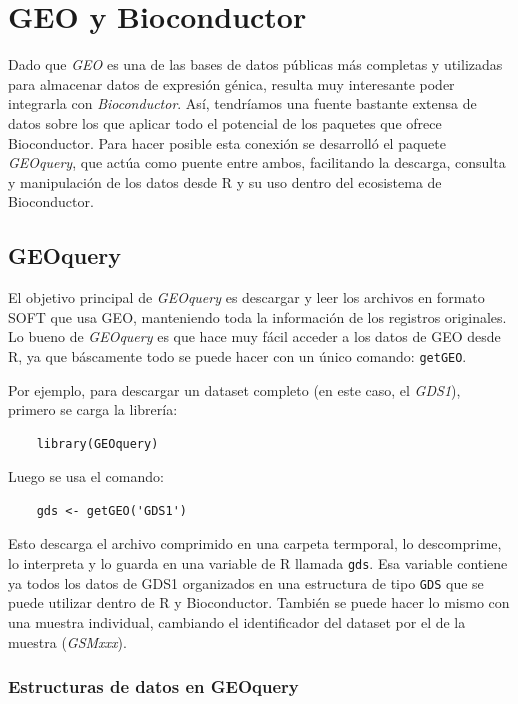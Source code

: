 \section{GEO y Bioconductor}

Dado que \textit{GEO} es una de las bases de datos públicas más completas y utilizadas para almacenar datos de expresión génica, resulta muy interesante
poder integrarla con \textit{Bioconductor}. Así, tendríamos una fuente bastante extensa de datos sobre los que aplicar todo el potencial de los paquetes 
que ofrece Bioconductor. Para hacer posible esta conexión se desarrolló el paquete \textit{GEOquery}, que actúa como puente entre ambos, facilitando la 
descarga, consulta y manipulación de los datos desde R y su uso dentro del ecosistema de Bioconductor.

\subsection{GEOquery}

El objetivo principal de \textit{GEOquery} es descargar y leer los archivos en formato SOFT que usa GEO, manteniendo toda la información de los registros 
originales. Lo bueno de \textit{GEOquery} es que hace muy fácil acceder a los datos de GEO desde R, ya que báscamente todo se puede hacer con un único comando:
\texttt{getGEO}. \newline

Por ejemplo, para descargar un dataset completo (en este caso, el \textit{GDS1}), primero se carga la librería:

\begin{verbatim}
    library(GEOquery)
\end{verbatim}

Luego se usa el comando:

\begin{verbatim}
    gds <- getGEO('GDS1')
\end{verbatim}

Esto descarga el archivo comprimido en una carpeta termporal, lo descomprime, lo interpreta y lo guarda en una variable de R llamada \texttt{gds}. Esa
variable contiene ya todos los datos de GDS1 organizados en una estructura de tipo \texttt{GDS} que se puede utilizar dentro de R y Bioconductor. También
se puede hacer lo mismo con una muestra individual, cambiando el identificador del dataset por el de la muestra (\textit{GSMxxx}).

\subsubsection{Estructuras de datos en GEOquery}

